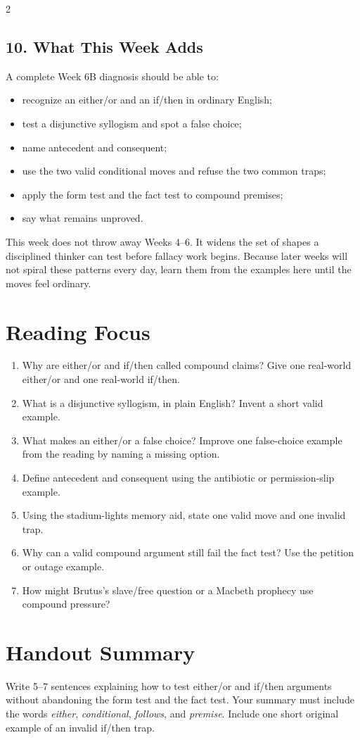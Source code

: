 \documentclass[12pt]{article}
\begin{document}
\begin{multicols}{2}
\subsection*{10. What This Week Adds}
A complete Week 6B diagnosis should be able to:
\begin{itemize}[leftmargin=*,itemsep=0.08em]
\item recognize an either/or and an if/then in ordinary English;
\item test a disjunctive syllogism and spot a false choice;
\item name antecedent and consequent;
\item use the two valid conditional moves and refuse the two common traps;
\item apply the form test and the fact test to compound premises;
\item say what remains unproved.
\end{itemize}

This week does not throw away Weeks 4--6. It widens the set of shapes a disciplined thinker can test before fallacy work begins. Because later weeks will not spiral these patterns every day, learn them from the examples here until the moves feel ordinary.

\section*{Reading Focus}
\begin{enumerate}[leftmargin=*]
\item Why are either/or and if/then called compound claims? Give one real-world either/or and one real-world if/then.
\item What is a disjunctive syllogism, in plain English? Invent a short valid example.
\item What makes an either/or a false choice? Improve one false-choice example from the reading by naming a missing option.
\item Define antecedent and consequent using the antibiotic or permission-slip example.
\item Using the stadium-lights memory aid, state one valid move and one invalid trap.
\item Why can a valid compound argument still fail the fact test? Use the petition or outage example.
\item How might Brutus's slave/free question or a Macbeth prophecy use compound pressure?
\end{enumerate}

\section*{Handout Summary}
Write 5--7 sentences explaining how to test either/or and if/then arguments without abandoning the form test and the fact test. Your summary must include the words \textit{either}, \textit{conditional}, \textit{follows}, and \textit{premise}. Include one short original example of an invalid if/then trap.
\end{multicols}
\end{document}
